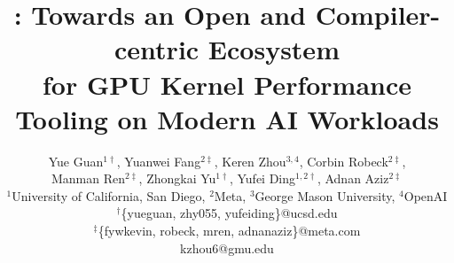 \documentclass[letterpaper,twocolumn,10pt]{article}
\begin{document}

\date{}

\title{\Large \bf \thiswork{}: Towards an Open and Compiler-centric Ecosystem \\for GPU Kernel Performance Tooling on Modern AI Workloads}

\author{
{\rm Yue Guan$^{1\dagger}$, Yuanwei Fang$^{2\ddagger}$, Keren Zhou$^{3,4}$, Corbin Robeck$^{2\ddagger}$,}\\{\rm Manman Ren$^{2\ddagger}$, Zhongkai Yu$^{1\dagger}$, Yufei Ding$^{1,2\dagger}$, Adnan Aziz$^{2\ddagger}$}\\
$^1$University of California, San Diego, $^2$Meta, $^3$George Mason University, $^4$OpenAI\\
$^\dagger$\{yueguan, zhy055, yufeiding\}@ucsd.edu\\
$^\ddagger$\{fywkevin, robeck, mren, adnanaziz\}@meta.com\\
kzhou6@gmu.edu
}

\maketitle













\appendix



\end{document}
